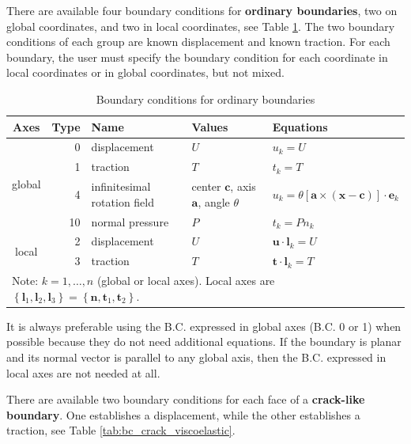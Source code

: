 \documentclass[a4paper,fleqn]{book}
\begin{document}
There are available four boundary conditions for \textbf{ordinary boundaries}, two on global coordinates, and two in local coordinates, see Table \ref{tab:bc_ordinary_viscoelastic}. The two boundary conditions of each group are known displacement and known traction. For each boundary, the user must specify the boundary condition for each coordinate in local coordinates or in global coordinates, but not mixed.

\begin{table}
\centering
{\footnotesize
\begin{tabular}{crlll}
\textbf{Axes} & \textbf{Type} & \textbf{Name} & \textbf{Values} & \textbf{Equations} \\
\midrule
\multirow{4}{*}{global} & 0 & displacement & $U$ & $u_k=U$ \\
\cline{2-5}
                        & 1 & traction     & $T$ & $t_k=T$ \\
\cline{2-5}
                        & 4 & infinitesimal rotation field & center $\mathbf{c}$, axis $\mathbf{a}$, angle $\theta$ & $u_k=\theta\left[\mathbf{a}\times\left(\mathbf{x}-\mathbf{c}\right)\right]\cdot\mathbf{e}_k$ \\
\cline{2-5}
                        & 10 & normal pressure & $P$ & $t_k=Pn_k$ \\
\hline
\multirow{2}{*}{local}  & 2 & displacement & $U$ & $\mathbf{u}\cdot\mathbf{l}_k=U$ \\
\cline{2-5}
                        & 3 & traction     & $T$ & $\mathbf{t}\cdot\mathbf{l}_k=T$ \\
\midrule
\multicolumn{5}{l}{Note: $k=1,\ldots,n$ (global or local axes). Local axes are $\left\{\mathbf{l}_1,\mathbf{l}_2,\mathbf{l}_3\right\}=\left\{\mathbf{n},\mathbf{t}_1,\mathbf{t}_2\right\}$.} \\
\end{tabular}
}
\caption{Boundary conditions for ordinary boundaries}
\label{tab:bc_ordinary_viscoelastic}
\end{table}

It is always preferable using the B.C. expressed in global axes (B.C. 0 or 1) when possible because they do not need additional equations. If the boundary is planar and its normal vector is parallel to any global axis, then the B.C. expressed in local axes are not needed at all.

There are available two boundary conditions for each face of a \textbf{crack-like boundary}. One establishes a displacement, while the other establishes a traction, see Table \ref{tab:bc_crack_viscoelastic}.
\end{document}

